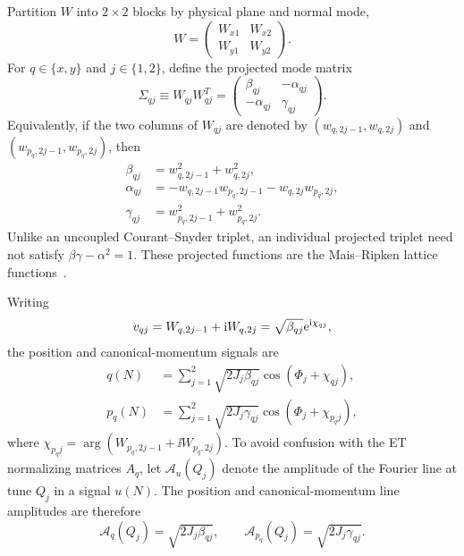 Partition $W$ into $2\times2$ blocks by physical plane and normal mode,
\begin{equation}
 W=
 \begin{pmatrix}
  W_{x1}&W_{x2}\\
  W_{y1}&W_{y2}
 \end{pmatrix}.
\end{equation}
For $q\in\{x,y\}$ and $j\in\{1,2\}$, define the projected mode matrix
\begin{equation}
 \Sigma_{qj}\equiv W_{qj}W_{qj}^T
 =
 \begin{pmatrix}
  \beta_{qj}&-\alpha_{qj}\\
  -\alpha_{qj}&\gamma_{qj}
 \end{pmatrix}.
 \label{eq:mr-sigma}
\end{equation}
Equivalently, if the two columns of $W_{qj}$ are denoted by $(w_{q,2j-1},w_{q,2j})$ and $(w_{p_q,2j-1},w_{p_q,2j})$, then
\begin{align}
 \beta_{qj}&=w_{q,2j-1}^2+w_{q,2j}^2,\\
 \alpha_{qj}&=-w_{q,2j-1}w_{p_q,2j-1}
               -w_{q,2j}w_{p_q,2j},\\
 \gamma_{qj}&=w_{p_q,2j-1}^2+w_{p_q,2j}^2.
 \label{eq:mr-functions-from-w}
\end{align}
Unlike an uncoupled Courant--Snyder triplet, an individual projected triplet need not satisfy $\beta\gamma-\alpha^2=1$.
These projected functions are the Mais--Ripken lattice functions~\cite{MaisRipken,LebedevBogacz}.

Writing
\begin{equation}
 v_{qj}=W_{q,2j-1}+\mathrm{i} W_{q,2j}
       =\sqrt{\beta_{qj}}\mathrm{e}^{\mathrm{i}\chi_{qj}},
\end{equation}
the position and canonical-momentum signals are
\begin{align}
 q(N)&=\sum_{j=1}^{2}\sqrt{2J_j\beta_{qj}}
       \cos\!\left(\Phi_j+\chi_{qj}\right),
 \label{eq:mr-position}\\
 p_q(N)&=\sum_{j=1}^{2}\sqrt{2J_j\gamma_{qj}}
       \cos\!\left(\Phi_j+\chi_{p_qj}\right),
 \label{eq:mr-momentum}
\end{align}
where $\chi_{p_qj}=\arg(W_{p_q,2j-1}+\ii W_{p_q,2j})$.  To avoid confusion
with the ET normalizing matrices $A_q$, let $\mathcal A_u(Q_j)$ denote the
amplitude of the Fourier line at tune $Q_j$ in a signal $u(N)$.  The position
and canonical-momentum line amplitudes are therefore
\begin{equation}
 \mathcal A_q(Q_j)=\sqrt{2J_j\beta_{qj}},
 \qquad
 \mathcal A_{p_q}(Q_j)=\sqrt{2J_j\gamma_{qj}}.
 \label{eq:mr-line-amplitudes}
\end{equation}

